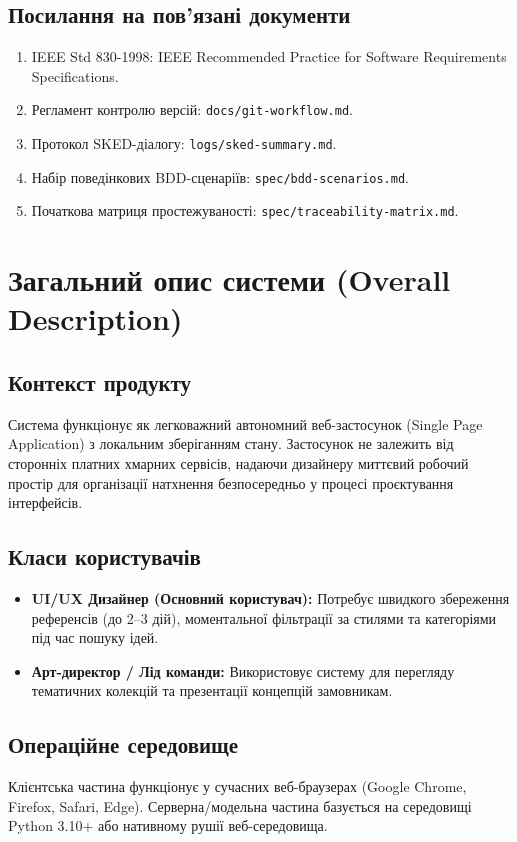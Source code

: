\documentclass[12pt,a4paper]{article}
\begin{document}
\subsection{Посилання на пов'язані документи}
\begin{enumerate}[noitemsep]
    \item IEEE Std 830-1998: IEEE Recommended Practice for Software Requirements Specifications.
    \item Регламент контролю версій: \texttt{docs/git-workflow.md}.
    \item Протокол SKED-діалогу: \texttt{logs/sked-summary.md}.
    \item Набір поведінкових BDD-сценаріїв: \texttt{spec/bdd-scenarios.md}.
    \item Початкова матриця простежуваності: \texttt{spec/traceability-matrix.md}.
\end{enumerate}

\section{Загальний опис системи (Overall Description)}

\subsection{Контекст продукту}
Система функціонує як легковажний автономний веб-застосунок (Single Page Application) з локальним зберіганням стану. Застосунок не залежить від сторонніх платних хмарних сервісів, надаючи дизайнеру миттєвий робочий простір для організації натхнення безпосередньо у процесі проєктування інтерфейсів.

\subsection{Класи користувачів}
\begin{itemize}
    \item \textbf{UI/UX Дизайнер (Основний користувач):} Потребує швидкого збереження референсів (до 2--3 дій), моментальної фільтрації за стилями та категоріями під час пошуку ідей.
    \item \textbf{Арт-директор / Лід команди:} Використовує систему для перегляду тематичних колекцій та презентації концепцій замовникам.
\end{itemize}

\subsection{Операційне середовище}
Клієнтська частина функціонує у сучасних веб-браузерах (Google Chrome, Firefox, Safari, Edge). Серверна/модельна частина базується на середовищі Python 3.10+ або нативному рушії веб-середовища.
\end{document}
